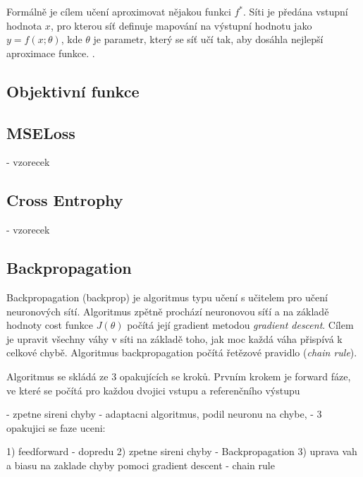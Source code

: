 Formálně je cílem učení aproximovat nějakou funkci $f^\ast$. Síti je předána vstupní hodnota $x$, pro kterou síť definuje mapování na výstupní hodnotu jako $y = f(x; \theta)$, kde $\theta$ je parametr, který se síť učí tak, aby dosáhla nejlepší aproximace funkce. \cite[p.~163]{mitdeeplearning}.


\subsection{Objektivní funkce}


\subsection*{MSELoss}
- vzorecek
\subsection*{Cross Entrophy}
- vzorecek



\subsection{Backpropagation}
Backpropagation (backprop) je algoritmus typu učení s učitelem pro učení neuronových sítí. Algoritmus zpětně prochází neuronovou síťí a na základě hodnoty cost funkce $J(\theta)$ počítá její gradient metodou \textit{gradient descent}. Cílem je upravit všechny váhy v síti na základě toho, jak moc každá váha přispívá k celkové chybě. Algoritmus backpropagation počítá řetězové pravidlo (\textit{chain rule}).

Algoritmus se skládá ze 3 opakujících se kroků. Prvním krokem je forward fáze, ve které se počítá pro každou dvojici vstupu a referenčního výstupu 


\cite{web-brilliant}
\cite[p~197]{deeplearning}


- zpetne sireni chyby
- adaptacni algoritmus, podil neuronu na chybe,
- 3 opakujici se faze uceni:

1) feedforward - dopredu
2) zpetne sireni chyby - Backpropagation
3) uprava vah a biasu na zaklade chyby pomoci gradient descent
- chain rule



